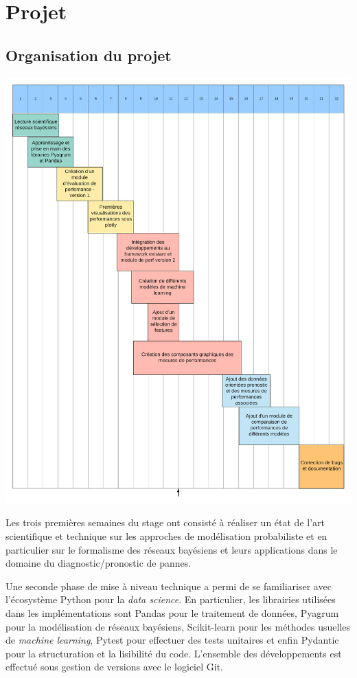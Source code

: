 \chapter{Projet}
\newpage
\section{Organisation du projet}

\begin{center}
\includegraphics[scale=0.3]{figures/Rapport_GANTT.png}
\label{fig1}
\end{center}

Les trois premières semaines du stage ont consisté à réaliser un état de l’art scientifique et technique sur les approches de modélisation probabiliste et en particulier sur le formalisme des réseaux bayésiens et leurs applications  dans le domaine du diagnostic/pronostic de pannes.

Une seconde phase de mise à niveau technique a permi de se familiariser avec  l’écosystème Python pour la \textit{data science}. En particulier, les librairies utilisées dans les implémentations sont Pandas pour le traitement de données, Pyagrum pour la modélisation de réseaux bayésiens, Scikit-learn pour les  méthodes usuelles de \textit{machine learning}, Pytest pour effectuer des tests unitaires et enfin Pydantic pour la structuration et la lisibilité du code. L’ensemble des développements est effectué sous gestion de versions avec le logiciel Git.

